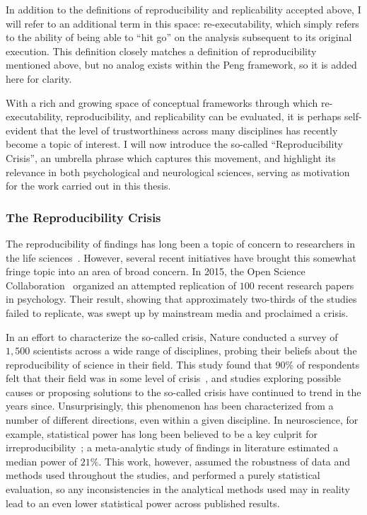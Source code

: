 In addition to the definitions of reproducibility and replicability accepted above, I will refer to an additional term
in this space: re-executability, which simply refers to the ability of being able to ``hit go'' on the analysis
subsequent to its original execution. This definition closely matches a definition of reproducibility mentioned above,
but no analog exists within the Peng framework, so it is added here for clarity.

With a rich and growing space of conceptual frameworks through which re-executability, reproducibility, and
replicability can be evaluated, it is perhaps self-evident that the level of trustworthiness across many disciplines
has recently become a topic of interest. I will now introduce the so-called ``Reproducibility Crisis'', an umbrella
phrase which captures this movement, and highlight its relevance in both psychological and neurological sciences,
serving as motivation for the work carried out in this thesis.

\subsubsection{The Reproducibility Crisis}

The reproducibility of findings has long been a topic of concern to researchers in the life
sciences~\cite{ioannidis2005most,begley2012raise,prinz2011believe,mcnutt2014reproducibility}. However, several recent
initiatives have brought this somewhat fringe topic into an area of broad concern. In 2015, the Open Science
Collaboration~\cite{open2015estimating} organized an attempted replication of $100$ recent research papers in
psychology. Their result, showing that approximately two-thirds of the studies failed to replicate, was swept up by
mainstream media and proclaimed a crisis.

In an effort to characterize the so-called crisis, Nature conducted a survey of $1,500$ scientists across a wide
range of disciplines, probing their beliefs about the reproducibility of science in their field. This study found that
$90\%$ of respondents felt that their field was in some level of crisis~\cite{baker20161}, and studies exploring
possible causes or proposing solutions to the so-called crisis have continued to trend in the years since.
Unsurprisingly, this phenomenon has been characterized from a number of different directions, even within a given
discipline. In neuroscience, for example, statistical power has long been believed to be a key culprit for
irreproducibility~\cite{button2013power}; a meta-analytic study of findings in literature estimated a median power of
$21\%$. This work, however, assumed the robustness of data and methods used throughout the studies, and performed a
purely statistical evaluation, so any inconsistencies in the analytical methods used may in reality lead to an even
lower statistical power across published results.


